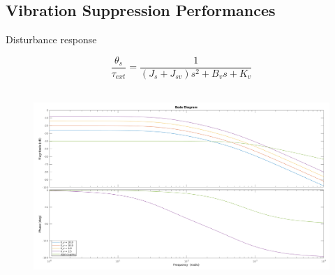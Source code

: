 \documentclass[10pt]{beamer}
\begin{document}
\subsection*{Vibration Suppression Performances}
\begin{frame}{Disturbance response}
	
  \begin{equation*}
    \dfrac{\theta_s}{\tau_{ext}} = \dfrac{1}{(J_s + J_{sv}) s^2 + B_v s + K_v}
  \end{equation*}\\
  \begin{figure}
  	\centering
  	\includegraphics[width=1\linewidth]{Images/bodeplot2}
  \end{figure}
  

\end{frame}
\end{document}
